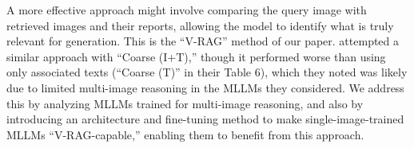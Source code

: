 A more effective approach might involve comparing the query image with retrieved images and their reports, allowing the model to identify what is truly relevant for generation.  This is the ``V-RAG'' method of our paper.
\citet{august} attempted a similar approach with ``Coarse (I+T),'' though it performed worse than using only associated texts (``Coarse (T)'' in their Table 6), which they noted was likely due to limited multi-image reasoning in the MLLMs they considered. 
We address this by analyzing MLLMs trained for multi-image reasoning, and also by introducing an architecture and fine-tuning method to make single-image-trained MLLMs ``V-RAG-capable,'' enabling them to benefit from this approach.

